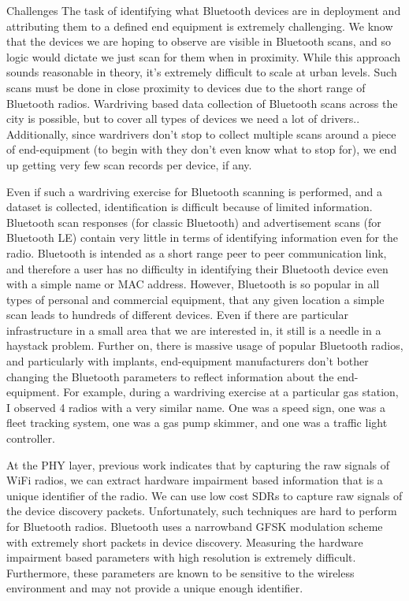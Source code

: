 \begin{dissertationintroduction}
    Challenges
    The task of identifying what Bluetooth devices are in deployment and attributing them to a defined end equipment is extremely challenging. We know that the devices we are hoping to observe are visible in Bluetooth scans, and so logic would dictate we just scan for them when in proximity. While  this approach sounds reasonable in theory, it’s extremely difficult to scale at urban levels. Such scans must be done in close proximity to devices due to the short range of Bluetooth radios. Wardriving based data collection of Bluetooth scans across the city is possible, but to cover all types of devices we need a lot of drivers.. Additionally, since wardrivers don’t stop to collect multiple scans around a piece of end-equipment (to begin with they don’t even know what to stop for), we end up getting very few scan records per device, if any.
    
    Even if such a wardriving exercise for Bluetooth scanning is performed, and a dataset is collected, identification is difficult because of limited information. Bluetooth scan responses (for classic Bluetooth) and advertisement scans (for Bluetooth LE) contain very little in terms of identifying information even for the radio. Bluetooth is intended as a short range peer to peer communication link, and therefore a user has no difficulty in identifying their Bluetooth device even with a simple name or MAC address. However, Bluetooth is so popular in all types of personal and commercial equipment, that any given location a simple scan leads to hundreds of different devices. Even if there are particular infrastructure in a small area that we are interested in, it still is a needle in a haystack problem. Further on, there is massive usage of popular Bluetooth radios, and particularly with implants, end-equipment manufacturers don’t bother changing the Bluetooth parameters to reflect information about the end-equipment. For example, during a wardriving exercise at a particular gas station,  I observed 4 radios with a very similar name. One was a speed sign, one was a fleet tracking system, one was a gas pump skimmer, and one was a traffic light controller.
    
    At the PHY layer, previous work indicates that by capturing the raw signals of WiFi radios, we can extract hardware impairment based information that is a unique identifier of the radio. We can use low cost SDRs to capture raw signals of the device discovery packets. Unfortunately, such techniques are hard to perform for Bluetooth radios. Bluetooth uses a narrowband GFSK modulation scheme with extremely short packets in device discovery. Measuring the hardware impairment based parameters with high resolution is extremely difficult. Furthermore, these parameters are known to be sensitive to the wireless environment and may not provide a unique enough identifier.
    

\end{dissertationintroduction}
